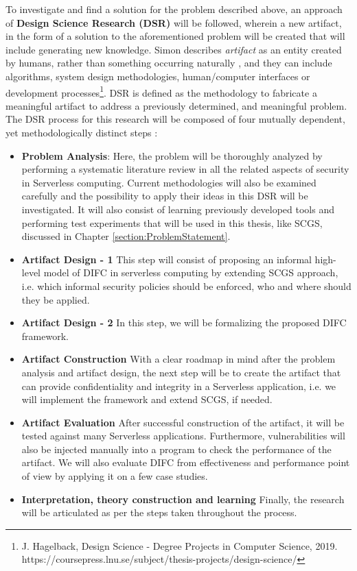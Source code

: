 To investigate and find a solution for the problem described above, an approach of \textbf{Design Science Research (DSR)} \cite{March1995} will be followed, wherein a new artifact, in the form of a solution to the aforementioned problem will be created that will include generating new knowledge. Simon describes \textit{artifact} as an entity created by humans, rather than something occurring naturally \cite{Simon1996}, and they can include algorithms, system design methodologies, human/computer interfaces or development processes\footnote{J. Hagelback, Design Science - Degree Projects in Computer Science, 2019. https://coursepress.lnu.se/subject/thesis-projects/design-science/}. DSR is defined as the methodology to fabricate a meaningful artifact to address a previously determined, and meaningful problem\cite{Nunamaker1990}. The DSR process for this research will be composed of four mutually dependent, yet methodologically distinct steps \cite{Mettler2014}:
\begin{itemize}
	\item \textbf{Problem Analysis}: Here, the problem will be thoroughly analyzed by performing a systematic literature review in all the related aspects of security in Serverless computing. Current methodologies will also be examined carefully and the possibility to apply their ideas in this DSR will be investigated. It will also consist of learning previously developed tools and performing test experiments that will be used in this thesis, like SCGS, discussed in Chapter \ref{section:ProblemStatement}.
	\item \textbf{Artifact Design - 1} This step will consist of proposing an informal high-level model of DIFC in serverless computing by extending SCGS approach, i.e. which informal security policies should be enforced, who and where should they be applied.
	\item \textbf{Artifact Design - 2} In this step, we will be formalizing the proposed DIFC framework.
	\item \textbf{Artifact Construction} With a clear roadmap in mind after the problem analysis and artifact design, the next step will be to create the artifact that can provide confidentiality and integrity in a Serverless application, i.e. we will implement the framework and extend SCGS, if needed.
	\item \textbf{Artifact Evaluation} After successful construction of the artifact, it will be tested against many Serverless applications. Furthermore, vulnerabilities will also be injected manually into a program to check the performance of the artifact. We will also evaluate DIFC from effectiveness and performance point of view by applying it on a few case studies.
	\item \textbf{Interpretation, theory construction and learning} Finally, the research will be articulated as per the steps taken throughout the process.
\end{itemize}
